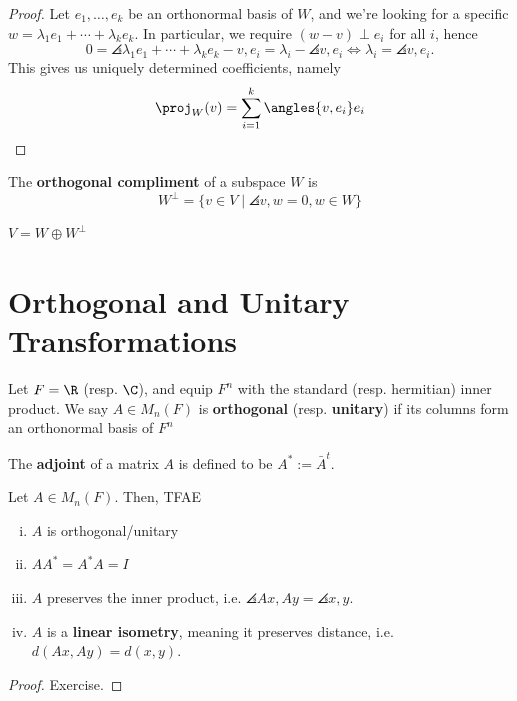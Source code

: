 \begin{proof}
    Let $e_1,\dots,e_k$ be an orthonormal basis of $W$, and we're looking for a specific $w = \lambda_1e_1+\cdots +\lambda_ke_k$. In particular, we require $(w-v) \perp e_i$ for all $i$, hence
    $$0=\angles{\lambda_1e_1+\cdots +\lambda_ke_k-v,e_i}=\lambda_i-\angles{v,e_i} \iff \lambda_i=\angles{v,e_i}.$$
    This gives us uniquely determined coefficients, namely
    $$\proj _W(v) = \sum_{i=1}^k\angles{v,e_i}e_i$$
\end{proof}

\begin{defn}
    The \textbf{orthogonal compliment} of a subspace $W$ is
    $$W^\perp = \{v \in V \mid \angles{v,w}=0,w \in W\}$$
\end{defn}

\begin{prop}
    $V = W \oplus W^\perp$
\end{prop}

\section{Orthogonal and Unitary Transformations}

\begin{defn}
    Let $F = \R$ (resp. $\C$), and equip $F^n$ with the standard (resp. hermitian) inner product. We say $A \in M_n(F)$ is \textbf{orthogonal} (resp. \textbf{unitary}) if its columns form an orthonormal basis of $F^n$
\end{defn}

\begin{defn}
    The \textbf{adjoint} of a matrix $A$ is defined to be $A^*:=\bar A^t$.
\end{defn}

\begin{thm}
    Let $A \in M_n(F)$. Then, TFAE
    \begin{enumerate}[(i)]
        \item $A$ is orthogonal/unitary
        \item $AA^*=A^*A=I$
        \item $A$ preserves the inner product, i.e. $\angles{Ax,Ay}=\angles{x,y}$.
        \item $A$ is a \textbf{linear isometry}, meaning it preserves distance, i.e. $d(Ax,Ay)=d(x,y)$.
    \end{enumerate}
\end{thm}

\begin{proof}
    Exercise.
\end{proof}

